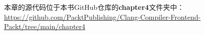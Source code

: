 本章的源代码位于本书GitHub仓库的\textbf{chapter4}文件夹中：
 \url{https://github.com/PacktPublishing/Clang-Compiler-Frontend-Packt/tree/main/chapter4}
